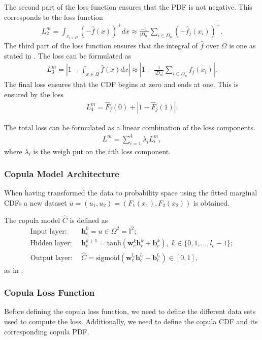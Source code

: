 The second part of the loss function ensures that the \gls{PDF} is not negative. This corresponds to the loss function 
\begin{align*}
    L_2^m = \int_{x_{i\in\Omega}} (-\hat{f}(x))^+dx \approx \frac{-1}{|D_{u}|} \sum_{i \in D_{u}} (-\hat{f}_j(x_i))^+.
\end{align*}
The third part of the loss function ensures that the integral of $\hat{f}$ over $\Omega$ is one as stated in . The loss can be formulated as 
\begin{align*}
    L_3^m = \left | 1- \int_{x\in \Omega} \hat{f}(x) dx    \right | \approx \left | 1- \frac{1}{|D_{u}|} \sum_{i \in D_{u}} \hat{f}_j(x_i)  \right |.
\end{align*}
The final loss ensures that the \gls{CDF} begins at zero and ends at one. This is ensured by the loss
\begin{align*}
    L_4^m = \hat{F}_j(0) + |1- \hat{F}_j(1) |.
\end{align*}

The total loss can be formulated as a linear combination of the loss components. 
\begin{align*}
    L^m = \sum_{i=1}^4 \lambda_i L_i^m,
\end{align*}
where $\lambda_i$ is the weigh put on the $i$:th loss component. 

\subsubsection{Copula Model Architecture} 
When having transformed the data to probability space using the fitted marginal \gls{CDF}s a new dataset $u = (u_1,u_2) = (F_1(x_1), F_2(x_2))$ is obtained. 

The copula model $\hat{C}$ is defined as 
\begin{align*}
    \mathrm{Input\;layer:} \; & \mathbf{h}_c^0 = u \in \Omega^2 = \mathbb{I}^2; \\
    \mathrm{Hidden\;layer:} \; & \mathbf{h}_c^{k+1} = \mathrm{tanh}(\mathbf{w}_c^{k} \mathbf{h}_c^{k} + \mathbf{b}_c^{k}), \; k \in \{0,1, \dots, l_c -1 \};\\
    \mathrm{Output\;layer:} \; & \hat{C} = \mathrm{sigmoid}(\mathbf{w}_c^{l_c} \mathbf{h}_c^{l_c} + \mathbf{b}_c^{l_c}) \in \left[0,1 \right],
\end{align*}
as in .

\subsubsection{Copula Loss Function}\label{sec:NeuralCopulaLoss}
Before defining the copula loss function, we need to define the different data sets used to compute the loss. Additionally, we need to define the copula \gls{CDF} and its corresponding copula \gls{PDF}. 

